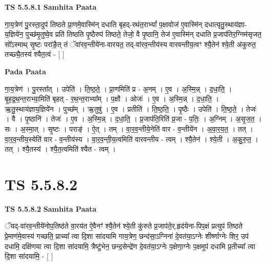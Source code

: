 \documentclass[17pt]{extarticle}
\begin{document}
\textbf{TS 5.5.8.1 } \newline
\textbf{Samhita Paata} \newline

गा॒य॒त्रेण॑ पु॒रस्ता॒दुप॑ तिष्ठते प्रा॒णमे॒वास्मि॑न् दधाति बृहद्-रथंत॒राभ्यां᳚ प॒क्षावोज॑ ए॒वास्मि॑न् दधात्यृतु॒स्थाय॑ज्ञा-य॒ज्ञिये॑न॒ पुच्छ॑मृ॒तुष्वे॒व प्रति॑ तिष्ठति पृ॒ष्ठैरुप॑ तिष्ठते॒ तेजो॒ वै पृ॒ष्ठानि॒ तेज॑ ए॒वास्मि॑न् दधाति प्र॒जाप॑तिर॒ग्निम॑सृजत॒ सो᳚ऽस्माथ् सृ॒ष्टः परा॑ङै॒त् तं ॅवा॑रव॒न्तीये॑ना-वारयत॒ तद्-वा॑रव॒न्तीय॑स्य वारवन्तीय॒त्वꣳ श्यै॒तेन॑ श्ये॒ती अ॑कुरुत॒ तच्छ्यै॒तस्य॑ श्यैत॒त्वं - [  ] \newline

\textbf{Pada Paata} \newline

गा॒य॒त्रेण॑ । पु॒रस्ता᳚त् । उपेति॑ । ति॒ष्ठ॒ते॒ । प्रा॒णमिति॑ प्र - अ॒नम् । ए॒व । अ॒स्मि॒न्न् । द॒धा॒ति॒ । बृ॒ह॒द्र॒थ॒न्त॒राभ्या॒मिति॑ बृहत् - र॒थ॒न्त॒राभ्या᳚म् । प॒क्षौ । ओजः॑ । ए॒व । अ॒स्मि॒न्न् । द॒धा॒ति॒ । ऋ॒तु॒स्थाय॑ज्ञाय॒ज्ञिये॑न । पुच्छ᳚म् । ऋ॒तुषु॑ । ए॒व । प्रतीति॑ । ति॒ष्ठ॒ति॒ । पृ॒ष्ठैः । उपेति॑ । ति॒ष्ठ॒ते॒ । तेजः॑ । वै । पृ॒ष्ठानि॑ । तेजः॑ । ए॒व । अ॒स्मि॒न्न् । द॒धा॒ति॒ । प्र॒जाप॑ति॒रिति॑ प्र॒जा - प॒तिः॒ । अ॒ग्निम् । अ॒सृ॒ज॒त॒ । सः । अ॒स्मा॒त् । सृ॒ष्टः । पराङ्॑ । ऐ॒त् । तम् । वा॒र॒व॒न्तीये॒नेति॑ वार - व॒न्तीये॑न । अ॒वा॒र॒य॒त॒ । तत् । वा॒र॒व॒न्तीय॒स्येति॑ वार - व॒न्तीय॑स्य । वा॒र॒व॒न्ती॒य॒त्वमिति॑ वारवन्तीय - त्वम् । श्यै॒तेन॑ । श्ये॒ती । अ॒कु॒रु॒त॒ । तत् । श्यै॒तस्य॑ । श्यै॒त॒त्वमिति॑ श्यैत - त्वम् ।  \newline





\section{ TS 5.5.8.2 }

\textbf{TS 5.5.8.2 } \newline
\textbf{Samhita Paata} \newline

ॅयद्-वा॑रव॒न्तीये॑नोप॒तिष्ठ॑ते वा॒रय॑त ऐ॒वैनꣳ॑ श्यै॒तेन॑ श्ये॒ती कु॑रुते प्र॒जाप॑ते॒र्.हृद॑येना-पिप॒क्षं प्रत्युप॑ तिष्ठते प्रे॒माण॑मे॒वास्य॑ गच्छति॒ प्राच्या᳚ त्वा दि॒शा सा॑दयामि गाय॒त्रेण॒ छन्द॑सा॒ऽग्निना॑ दे॒वत॑या॒ऽग्नेः शीर्ष्णाग्नेः शिर॒ उप॑ दधामि॒ दक्षि॑णया त्वा दि॒शा सा॑दयामि॒ त्रैष्टु॑भेन॒ छन्द॒सेन्द्रे॑ण दे॒वत॑या॒ऽग्नेः प॒क्षेणा॒ग्नेः प॒क्षमुप॑ दधामि प्र॒तीच्या᳚ त्वा दि॒शा सा॑दयामि॒ - [  ] \newline
\end{document}
